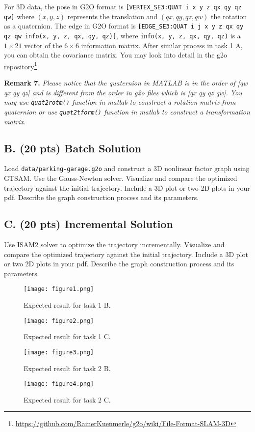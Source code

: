 \documentclass{article}
\begin{document}
For 3D data, the pose in G2O format is \texttt{[VERTEX\_SE3:QUAT i x y z qx qy qz qw]} where $(x,y,z)$ represents the translation and $(qx,qy,qz,qw)$ the rotation as a quaternion. The edge in G2O format is \texttt{[EDGE\_SE3:QUAT i j x y z qx qy qz qw info(x, y, z, qx, qy, qz)]}, where \texttt{info(x, y, z, qx, qy, qz)} is a $1 \times 21$ vector of the $6 \times 6$ information matrix. After similar process in task 1 A, you can obtain the covariance matrix. You may look into detail in the g2o repository\footnote{\url{https://github.com/RainerKuenmerle/g2o/wiki/File-Format-SLAM-3D}}.

\textbf{Remark 7.} \textit{Please notice that the quaternion in MATLAB is in the order of [qw qx qy qz] and is different from the order in g2o files which is [qx qy qz qw]. You may use \texttt{quat2rotm()} function in matlab to construct a rotation matrix from quaternion or use \texttt{quat2tform()} function in matlab to construct a transformation matrix.}

\subsection{B. (20 pts) Batch Solution}
Load \texttt{data/parking-garage.g2o} and construct a 3D nonlinear factor graph using GTSAM. Use the Gauss-Newton solver. Visualize and compare the optimized trajectory against the initial trajectory. Include a 3D plot or two 2D plots in your pdf. Describe the graph construction process and its parameters.

\subsection{C. (20 pts) Incremental Solution}
Use ISAM2 solver to optimize the trajectory incrementally. Visualize and compare the optimized trajectory against the initial trajectory. Include a 3D plot or two 2D plots in your pdf. Describe the graph construction process and its parameters.

\begin{figure}[h]
    \centering
    \texttt{[image: figure1.png]}
    \caption{Expected result for task 1 B.}
    \label{fig:task1b}
\end{figure}

\begin{figure}[h]
    \centering
    \texttt{[image: figure2.png]}
    \caption{Expected result for task 1 C.}
    \label{fig:task1c}
\end{figure}

\begin{figure}[h]
    \centering
    \texttt{[image: figure3.png]}
    \caption{Expected result for task 2 B.}
    \label{fig:task2b}
\end{figure}

\begin{figure}[h]
    \centering
    \texttt{[image: figure4.png]}
    \caption{Expected result for task 2 C.}
    \label{fig:task2c}
\end{figure}
\end{document}
